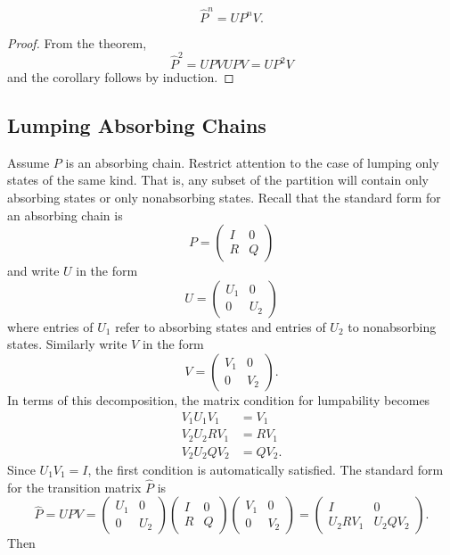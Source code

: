 \documentclass[12pt]{article}
\begin{document}
\begin{corollary}
    \[
        \hat{P}^n = U P^n V.
    \]
\end{corollary}

\begin{proof}
    From the theorem,
    \[
        \hat{P}^2 = U P V U P V = U P^2 V
    \] and the corollary follows by induction.
\end{proof}

\subsection*{Lumping Absorbing Chains}

Assume \( P \) is an absorbing chain.  Restrict attention to the case of
lumping only states of the same kind.  That is, any subset of the
partition will contain only absorbing states or only nonabsorbing
states.  Recall that the standard form for an absorbing chain is
\[
    P =
    \begin{pmatrix}
        I & 0 \\
        R & Q
    \end{pmatrix}
\] and write \( U \) in the form
\[
    U =
    \begin{pmatrix}
        U_1 & 0 \\
        0 & U_{2}
    \end{pmatrix}
\] where entries of \( U_1 \) refer to absorbing states and entries of \(
U_2 \) to nonabsorbing states.  Similarly write \( V \) in the form
\[
    V =
    \begin{pmatrix}
        V_1 & 0 \\
        0 & V_{2}
    \end{pmatrix}
    .
\] In terms of this decomposition, the matrix condition for lumpability
becomes
\begin{align*}
    V_1 U_1 V_1 &= V_1 \\
    V_2 U_2 R V_1 &= R V_1 \\
    V_2 U_2 Q V_2 &= Q V_2.
\end{align*}
Since \( U_1 V_1 = I \), the first condition is automatically satisfied.
The standard form for the transition matrix \( \hat{P} \) is
\[
    \hat{P} = UPV =
    \begin{pmatrix}
        U_1 & 0 \\
        0 & U_{2}
    \end{pmatrix}
    \begin{pmatrix}
        I & 0 \\
        R & Q
    \end{pmatrix}
    \begin{pmatrix}
        V_1 & 0 \\
        0 & V_{2}
    \end{pmatrix}
    =
    \begin{pmatrix}
        I & 0 \\
        U_2 R V_1 & U_2 Q V_2
    \end{pmatrix}
    .
\] Then
\end{document}
